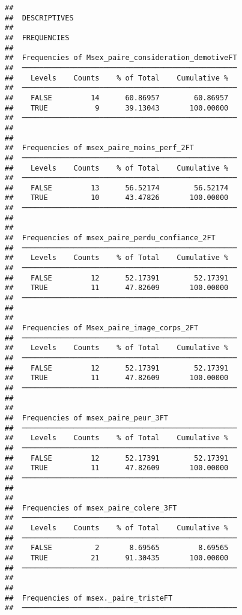 \documentclass[
]{article}
\begin{document}
\begin{verbatim}
## 
##  DESCRIPTIVES
## 
##  FREQUENCIES
## 
##  Frequencies of Msex_paire_consideration_demotiveFT 
##  ────────────────────────────────────────────────── 
##    Levels    Counts    % of Total    Cumulative %   
##  ────────────────────────────────────────────────── 
##    FALSE         14      60.86957        60.86957   
##    TRUE           9      39.13043       100.00000   
##  ────────────────────────────────────────────────── 
## 
## 
##  Frequencies of msex_paire_moins_perf_2FT           
##  ────────────────────────────────────────────────── 
##    Levels    Counts    % of Total    Cumulative %   
##  ────────────────────────────────────────────────── 
##    FALSE         13      56.52174        56.52174   
##    TRUE          10      43.47826       100.00000   
##  ────────────────────────────────────────────────── 
## 
## 
##  Frequencies of msex_paire_perdu_confiance_2FT      
##  ────────────────────────────────────────────────── 
##    Levels    Counts    % of Total    Cumulative %   
##  ────────────────────────────────────────────────── 
##    FALSE         12      52.17391        52.17391   
##    TRUE          11      47.82609       100.00000   
##  ────────────────────────────────────────────────── 
## 
## 
##  Frequencies of Msex_paire_image_corps_2FT          
##  ────────────────────────────────────────────────── 
##    Levels    Counts    % of Total    Cumulative %   
##  ────────────────────────────────────────────────── 
##    FALSE         12      52.17391        52.17391   
##    TRUE          11      47.82609       100.00000   
##  ────────────────────────────────────────────────── 
## 
## 
##  Frequencies of msex_paire_peur_3FT                 
##  ────────────────────────────────────────────────── 
##    Levels    Counts    % of Total    Cumulative %   
##  ────────────────────────────────────────────────── 
##    FALSE         12      52.17391        52.17391   
##    TRUE          11      47.82609       100.00000   
##  ────────────────────────────────────────────────── 
## 
## 
##  Frequencies of msex_paire_colere_3FT               
##  ────────────────────────────────────────────────── 
##    Levels    Counts    % of Total    Cumulative %   
##  ────────────────────────────────────────────────── 
##    FALSE          2       8.69565         8.69565   
##    TRUE          21      91.30435       100.00000   
##  ────────────────────────────────────────────────── 
## 
## 
##  Frequencies of msex._paire_tristeFT                
##  ────────────────────────────────────────────────── 

\end{verbatim}
\end{document}
